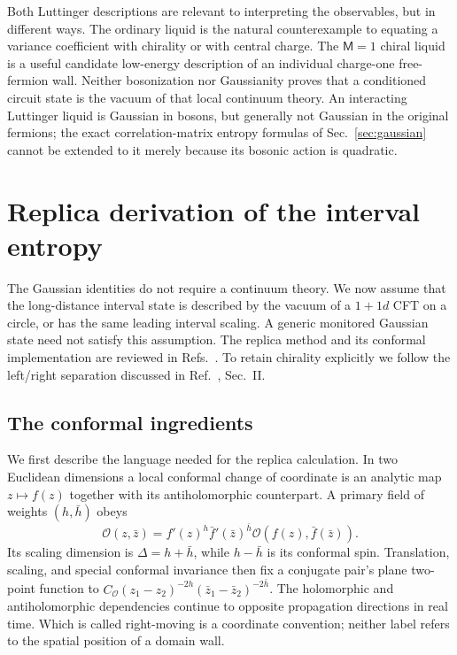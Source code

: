 \documentclass[aps,prb,onecolumn,nofootinbib,superscriptaddress]{revtex4-2}
\begin{document}
Both Luttinger descriptions are relevant to interpreting the observables,
but in different ways. The ordinary liquid is the natural counterexample
to equating a variance coefficient with chirality or with central charge.
The $\mathsf M=1$ chiral liquid is a useful candidate low-energy
description of an individual charge-one free-fermion wall. Neither
bosonization nor Gaussianity proves that a conditioned circuit state is
the vacuum of that local continuum theory. An interacting Luttinger
liquid is Gaussian in bosons, but generally not Gaussian in the original
fermions; the exact correlation-matrix entropy formulas of
Sec.~\ref{sec:gaussian} cannot be extended to it merely because its bosonic
action is quadratic.

\section{Replica derivation of the interval entropy}
\label{sec:replica}
The Gaussian identities do not require a continuum theory. We now assume
that the long-distance interval state is described by the vacuum of a
$1+1d$ CFT on a circle, or has the same leading interval scaling.
A generic monitored Gaussian state need not satisfy this assumption.
The replica method and its conformal implementation are reviewed in
Refs.~\cite{CalabreseCardy2004,CalabreseCardy2009}. To retain chirality
explicitly we follow the left/right separation discussed in
Ref.~\cite{CastroDetournayIqbalPerlmutter2014}, Sec.~II.

\subsection{The conformal ingredients}
We first describe the language needed for the replica calculation.
In two Euclidean dimensions a local conformal change of coordinate is
an analytic map $z\mapsto f(z)$ together with its antiholomorphic
counterpart. A primary field of weights $(h,\bar h)$ obeys
\begin{equation}
 \mathcal O(z,\bar z)=f'(z)^h\bar f'(\bar z)^{\bar h}
                \mathcal O(f(z),\bar f(\bar z)).
 \label{eq:primary-transformation}
\end{equation}
Its scaling dimension is $\Delta=h+\bar h$, while $h-\bar h$ is its
conformal spin. Translation, scaling, and special conformal invariance
then fix a conjugate pair's plane two-point function to
$C_{\mathcal O}(z_1-z_2)^{-2h}(\bar z_1-\bar z_2)^{-2\bar h}$.
The holomorphic and antiholomorphic dependencies continue to opposite
propagation directions in real time. Which is called right-moving is a
coordinate convention; neither label refers to the spatial position of a
domain wall.
\end{document}
